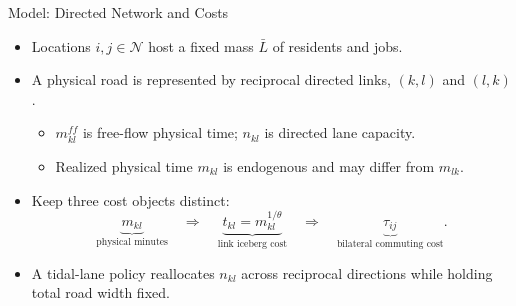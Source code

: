 \documentclass[11pt,aspectratio=169]{beamer}
\begin{document}
\begin{frame}{Model: Directed Network and Costs}
\begin{itemize}\small
  \item Locations $i,j\in\mathcal N$ host a fixed mass $\bar L$ of residents and jobs.
  \item A physical road is represented by reciprocal directed links, $(k,l)$ and $(l,k)$.
  \begin{itemize}\footnotesize
    \item $m_{kl}^{ff}$ is free-flow physical time; $n_{kl}$ is directed lane capacity.
    \item Realized physical time $m_{kl}$ is endogenous and may differ from $m_{lk}$.
  \end{itemize}
  \item Keep three cost objects distinct:
  \vspace{-0.35em}
  \begin{equation}
    \underbrace{m_{kl}}_{\text{physical minutes}}
    \quad\Longrightarrow\quad
    \underbrace{t_{kl}=m_{kl}^{1/\theta}}_{\text{link iceberg cost}}
    \quad\Longrightarrow\quad
    \underbrace{\tau_{ij}}_{\text{bilateral commuting cost}}.
  \end{equation}
  \vspace{-0.6em}
  \item A tidal-lane policy reallocates $n_{kl}$ across reciprocal directions while holding total road width fixed.
\end{itemize}
\end{frame}
\end{document}

